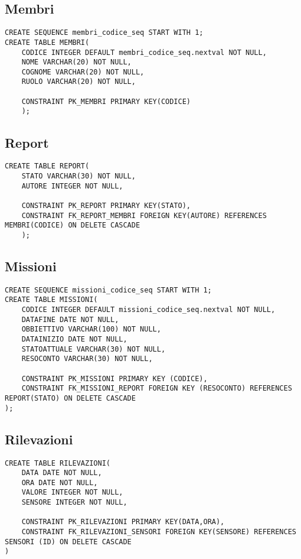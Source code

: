 \begin{description}
\subsection{Membri}
\begin{verbatim}
CREATE SEQUENCE membri_codice_seq START WITH 1;
CREATE TABLE MEMBRI(
    CODICE INTEGER DEFAULT membri_codice_seq.nextval NOT NULL,
    NOME VARCHAR(20) NOT NULL,
    COGNOME VARCHAR(20) NOT NULL,
    RUOLO VARCHAR(20) NOT NULL,
    
    CONSTRAINT PK_MEMBRI PRIMARY KEY(CODICE)
    );
\end{verbatim}

\subsection{Report}
\begin{verbatim}
CREATE TABLE REPORT(
    STATO VARCHAR(30) NOT NULL,
    AUTORE INTEGER NOT NULL,
    
    CONSTRAINT PK_REPORT PRIMARY KEY(STATO),
    CONSTRAINT FK_REPORT_MEMBRI FOREIGN KEY(AUTORE) REFERENCES MEMBRI(CODICE) ON DELETE CASCADE
    );
\end{verbatim}

\subsection{Missioni}
\begin{verbatim}
CREATE SEQUENCE missioni_codice_seq START WITH 1;
CREATE TABLE MISSIONI(
    CODICE INTEGER DEFAULT missioni_codice_seq.nextval NOT NULL,
    DATAFINE DATE NOT NULL,
    OBBIETTIVO VARCHAR(100) NOT NULL,
    DATAINIZIO DATE NOT NULL,
    STATOATTUALE VARCHAR(30) NOT NULL,
    RESOCONTO VARCHAR(30) NOT NULL,
    
    CONSTRAINT PK_MISSIONI PRIMARY KEY (CODICE),
    CONSTRAINT FK_MISSIONI_REPORT FOREIGN KEY (RESOCONTO) REFERENCES REPORT(STATO) ON DELETE CASCADE
);
\end{verbatim}

\subsection{Rilevazioni}
\begin{verbatim}
CREATE TABLE RILEVAZIONI(
    DATA DATE NOT NULL,
    ORA DATE NOT NULL, 
    VALORE INTEGER NOT NULL,
    SENSORE INTEGER NOT NULL,
    
    CONSTRAINT PK_RILEVAZIONI PRIMARY KEY(DATA,ORA),
    CONSTRAINT FK_RILEVAZIONI_SENSORI FOREIGN KEY(SENSORE) REFERENCES SENSORI (ID) ON DELETE CASCADE
)
\end{verbatim}


\end{description}

